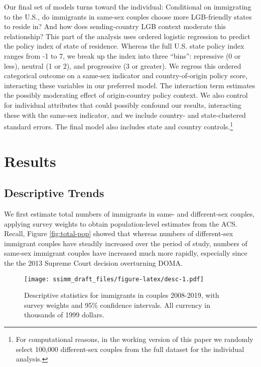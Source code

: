 \documentclass[
  11pt,
]{article}
\begin{document}
Our final set of models turns toward the individual: Conditional on immigrating to the U.S., do immigrants in same-sex couples choose more LGB-friendly states to reside in? And how does sending-country LGB context moderate this relationship? This part of the analysis uses ordered logistic regression to predict the policy index of state of residence. Whereas the full U.S. state policy index ranges from -1 to 7, we break up the index into three ``bins'': repressive (0 or less), neutral (1 or 2), and progressive (3 or greater). We regress this ordered categorical outcome on a same-sex indicator and country-of-origin policy score, interacting these variables in our preferred model. The interaction term estimates the possibly moderating effect of origin-country policy context. We also control for individual attributes that could possibly confound our results, interacting these with the same-sex indicator, and we include country- and state-clustered standard errors. The final model also includes state and country controls.\footnote{For computational reasons, in the working version of this paper we randomly select 100,000 different-sex couples from the full dataset for the individual analysis.}

\hypertarget{results}{%
\section{Results}\label{results}}

\hypertarget{descriptive-trends}{%
\subsection{Descriptive Trends}\label{descriptive-trends}}

We first estimate total numbers of immigrants in same- and different-sex couples, applying survey weights to obtain population-level estimates from the ACS. Recall, Figure \ref{fig:total-pop} showed that whereas numbers of different-sex immigrant couples have steadily increased over the period of study, numbers of same-sex immigrant couples have increased much more rapidly, especially since the the 2013 Supreme Court decision overturning DOMA.

\begin{figure}
\centering
\texttt{[image: ssimm\_draft\_files/figure-latex/desc-1.pdf]}
\caption{\label{fig:desc}Descriptive statistics for immigrants in couples 2008-2019, with survey weights and 95\% confidence intervals. All currency in thousands of 1999 dollars.}
\end{figure}
\end{document}
